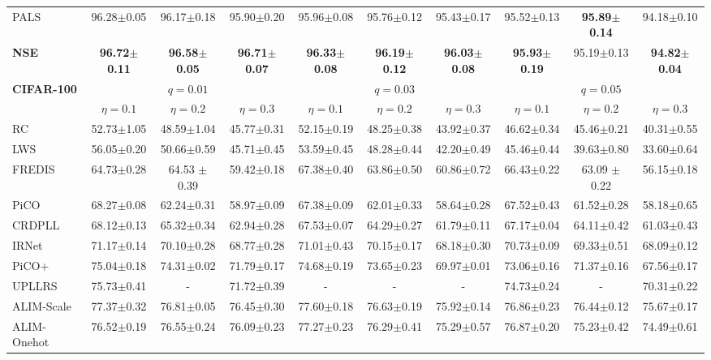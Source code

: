 \begin{table}[t]
\begin{tabular}{l|ccc|ccc|ccc}
PALS & { 96.28$\pm$0.05} & { 96.17$\pm$0.18} & { 95.90$\pm$0.20} & { 95.96$\pm$0.08} & { 95.76$\pm$0.12} & { 95.43$\pm$0.17} & { 95.52$\pm$0.13} & \textbf{95.89$\pm$0.14} & { 94.18$\pm$0.10} \\
\rowcolor{gray!15} \textbf{NSE} &\textbf{96.72$\pm$0.11} & \textbf{96.58$\pm$0.05} & \textbf{96.71$\pm$0.07} & \textbf{96.33$\pm$0.08} & \textbf{96.19$\pm$0.12} & \textbf{96.03$\pm$0.08} & \textbf{95.93$\pm$0.19} & 95.19$\pm$0.13 & \textbf{94.82$\pm$0.04} \\
\midrule
\hline
\multirow{2}{*}{\textbf{CIFAR-100}} &\multicolumn{3}{c|}{ $q=0.01$} &\multicolumn{3}{c|}{$q=0.03$} &\multicolumn{3}{c}{$q=0.05$}\\
\cline{2-10}
&$\eta=0.1$ &$\eta=0.2$ &$\eta=0.3$ &$\eta=0.1$ &$\eta=0.2$ &$\eta=0.3$ &$\eta=0.1$ &$\eta=0.2$ &$\eta=0.3$ \\
\hline
RC& 52.73$\pm$1.05& 48.59$\pm$1.04& 45.77$\pm$0.31& 52.15$\pm$0.19& 48.25$\pm$0.38& 43.92$\pm$0.37& 46.62$\pm$0.34& 45.46$\pm$0.21&40.31$\pm$0.55\\
LWS& 56.05$\pm$0.20& 50.66$\pm$0.59& 45.71$\pm$0.45& 53.59$\pm$0.45& 48.28$\pm$0.44& 42.20$\pm$0.49& 45.46$\pm$0.44& 39.63$\pm$0.80&33.60$\pm$0.64\\
FREDIS& 64.73$\pm$0.28& 64.53 $\pm$ 0.39 & 59.42$\pm$0.18& 67.38$\pm$0.40 & 63.86$\pm$0.50 & 60.86$\pm$0.72 & 66.43$\pm$0.22& 63.09 $\pm$ 0.22 &56.15$\pm$0.18\\
PiCO& 68.27$\pm$0.08& 62.24$\pm$0.31& 58.97$\pm$0.09& 67.38$\pm$0.09& 62.01$\pm$0.33& 58.64$\pm$0.28& 67.52$\pm$0.43& 61.52$\pm$0.28&58.18$\pm$0.65\\
CRDPLL& 68.12$\pm$0.13& 65.32$\pm$0.34& 62.94$\pm$0.28& 67.53$\pm$0.07& 64.29$\pm$0.27& 61.79$\pm$0.11& 67.17$\pm$0.04& 64.11$\pm$0.42&61.03$\pm$0.43\\
IRNet& 71.17$\pm$0.14& 70.10$\pm$0.28& 68.77$\pm$0.28& 71.01$\pm$0.43& 70.15$\pm$0.17& 68.18$\pm$0.30& 70.73$\pm$0.09& 69.33$\pm$0.51&68.09$\pm$0.12\\
PiCO+ & 75.04$\pm$0.18 & 74.31$\pm$0.02 & 71.79$\pm$0.17 & 74.68$\pm$0.19 & 73.65$\pm$0.23 & 69.97$\pm$0.01 & 73.06$\pm$0.16 & 71.37$\pm$0.16 & 67.56$\pm$0.17 \\
UPLLRS& 75.73$\pm$0.41& -& 71.72$\pm$0.39& -& -& -& 74.73$\pm$0.24& -&70.31$\pm$0.22\\
ALIM-Scale & 77.37$\pm$0.32 & 76.81$\pm$0.05 & 76.45$\pm$0.30 & 77.60$\pm$0.18 & 76.63$\pm$0.19 & 75.92$\pm$0.14 & 76.86$\pm$0.23 & 76.44$\pm$0.12 & 75.67$\pm$0.17 \\
ALIM-Onehot & 76.52$\pm$0.19 & 76.55$\pm$0.24 & 76.09$\pm$0.23 & 77.27$\pm$0.23 & 76.29$\pm$0.41 & 75.29$\pm$0.57 & 76.87$\pm$0.20 & 75.23$\pm$0.42 & 74.49$\pm$0.61 \\ 

\end{tabular}
\end{table}
